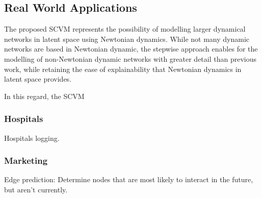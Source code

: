 \subsection{Real World Applications}
\label{sec:Discussion:UseCases}
The proposed SCVM represents the possibility of modelling larger dynamical networks in latent space using Newtonian dynamics.
While not many dynamic networks are based in Newtonian dynamic, the stepwise approach enables for the modelling of non-Newtonian dynamic networks with greater detail than previous work, while retaining the ease of explainability that Newtonian dynamics in latent space provides.

In this regard, the SCVM 


\subsubsection{Hospitals}
\label{sec:Discussion:UseCases:Hospitals}
Hospitals logging.



\subsubsection{Marketing}
\label{sec:Discussion:UseCases:Marketing}
Edge prediction: Determine nodes that are most likely to interact in the future, but aren't currently.
